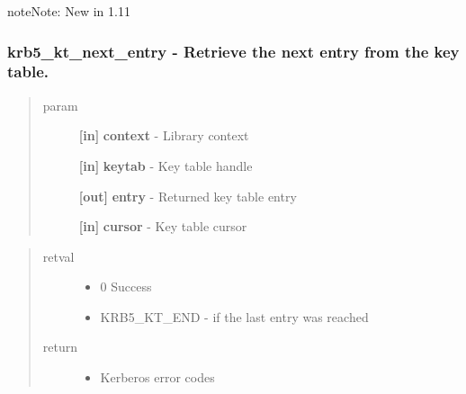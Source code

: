 \documentclass[letterpaper,10pt,english]{sphinxmanual}
\begin{document}
\begin{notice}{note}{Note:}
New in 1.11
\end{notice}


\subsubsection{krb5\_kt\_next\_entry -  Retrieve the next entry from the key table.}
\label{appdev/refs/api/krb5_kt_next_entry:krb5-kt-next-entry-retrieve-the-next-entry-from-the-key-table}\label{appdev/refs/api/krb5_kt_next_entry::doc}

\begin{fulllineitems}
\label{appdev/refs/api/krb5_kt_next_entry:krb5_kt_next_entry}
\end{fulllineitems}

\begin{quote}\begin{description}
\item[{param}] \leavevmode
\textbf{{[}in{]}} \textbf{context} - Library context

\textbf{{[}in{]}} \textbf{keytab} - Key table handle

\textbf{{[}out{]}} \textbf{entry} - Returned key table entry

\textbf{{[}in{]}} \textbf{cursor} - Key table cursor

\end{description}\end{quote}
\begin{quote}\begin{description}
\item[{retval}] \leavevmode\begin{itemize}
\item {} 
0   Success

\item {} 
KRB5\_KT\_END   - if the last entry was reached

\end{itemize}

\item[{return}] \leavevmode\begin{itemize}
\item {} 
Kerberos error codes

\end{itemize}

\end{description}\end{quote}
\end{document}
